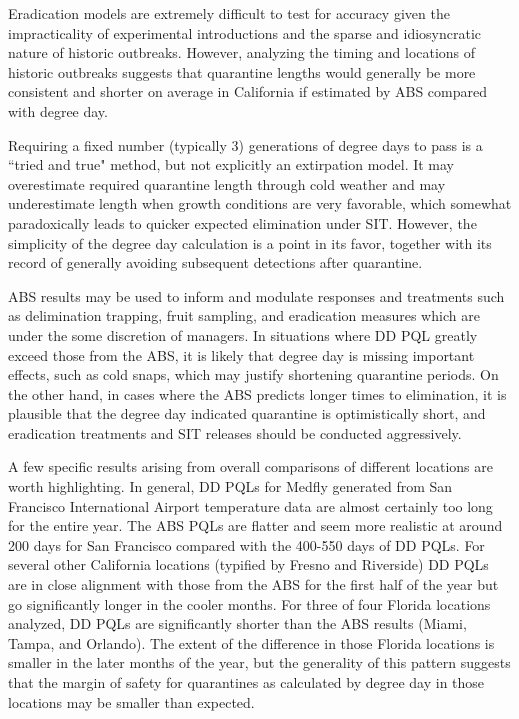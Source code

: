 \documentclass[10pt,a4paper,twocolumn]{article}
\begin{document}

Eradication models are extremely difficult to test for accuracy given 
the impracticality of experimental introductions and 
the sparse and idiosyncratic nature of historic outbreaks.
However, analyzing the timing and locations of historic outbreaks 
suggests that quarantine lengths would generally be more consistent
and shorter on average in California if estimated by ABS compared with degree day. 

Requiring a fixed number (typically 3) generations of degree days to pass is 
a ``tried and true" method, but not explicitly an extirpation model.
It may overestimate required quarantine length through cold weather\cite{manoukis_agent-based_2014}
and may underestimate length when growth conditions are very favorable, 
which somewhat paradoxically leads to quicker expected elimination under SIT. %
However, the simplicity of the degree day calculation is a point in its favor, together with 
its record of generally avoiding subsequent detections after quarantine\cite{mcinnis2017can}.

ABS results may be used to inform and modulate responses and treatments such as
delimination trapping, fruit sampling, and eradication measures which are under
the some discretion of managers.
In situations where DD PQL greatly exceed those from the ABS, it is likely
that degree day is missing important effects, such as cold snaps, which may justify
shortening quarantine periods.
On the other hand, in cases where the ABS predicts longer times to elimination, it
is plausible that the degree day indicated quarantine is optimistically short, and 
eradication treatments and SIT releases should be conducted aggressively.


A few specific results arising from overall comparisons of different locations are worth highlighting. 
In general, DD PQLs for Medfly 
generated from San Francisco International Airport temperature data
 are almost certainly too long for the entire year.
The ABS PQLs are flatter and seem more realistic at around 200 days for San
Francisco compared with the 400-550 days of DD PQLs. 
For several other California locations (typified by Fresno and 
Riverside) DD PQLs are in close alignment with those from the ABS 
for the first half of the year 
but go significantly longer in the cooler months. 
For three of four Florida locations analyzed, 
DD PQLs are significantly shorter than the ABS results
 (Miami, Tampa, and Orlando).
The extent of the difference in those Florida locations is smaller in the later months of the year,
but the generality of this pattern suggests that the margin of safety for quarantines as 
calculated by degree day in those locations may be smaller than expected. 
\end{document}
